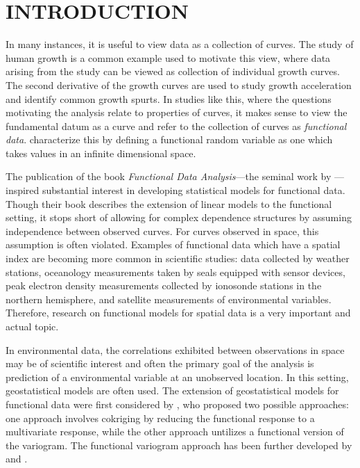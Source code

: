 
\chapter{INTRODUCTION}
In many instances, it is useful to view data as a collection of curves. The study of human growth is a common example used to motivate this view, where data arising from the study can be viewed as collection of individual growth curves.  The second derivative of the growth curves are used to study growth acceleration and identify common growth spurts. In studies like this, where the questions motivating the analysis relate to properties of curves, it makes sense to view the fundamental datum as a curve and refer to the collection of curves as \emph{functional data}.  \cite{ferraty2006nonparametric} characterize this by defining a functional random variable as one which takes values in an infinite dimensional space. 

The publication of the book \emph{Functional Data Analysis}---the seminal work by \cite{FDA}---inspired substantial interest in developing statistical models for functional data.  Though their book describes the extension of linear models to the functional setting, it stops short of allowing for complex dependence structures by assuming independence between observed curves. For curves observed in space, this assumption is often violated. Examples of functional data which have a spatial index are becoming more common in scientific studies: data collected by weather stations, oceanology measurements taken by seals equipped with sensor devices, peak electron density measurements collected by ionosonde stations in the northern hemisphere, and satellite measurements of environmental variables. Therefore,  research on functional models for spatial data is a very important and actual topic.

 In environmental data,  the correlations exhibited between observations in space may be of scientific interest and often the primary goal of the analysis is prediction of a environmental variable at an unobserved location.  In this setting, geostatistical models are often used. The extension of geostatistical models for functional data were first considered by \cite{Goulard:1993}, who proposed two possible approaches: one approach involves cokriging by reducing the functional response to a multivariate response, while the other approach untilizes a functional version of the variogram.  The functional variogram approach has been further developed by \cite{Giraldo:2010jx} and \cite{Nerini:2010ba}.

